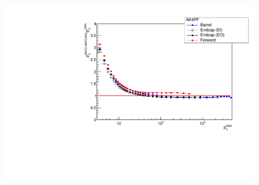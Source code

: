 {\begin{columns}
\begin{column}{0.49\textwidth}
			\includegraphics[width=\textwidth]{images/response.pdf}
		\end{column}
	\end{columns}
}

